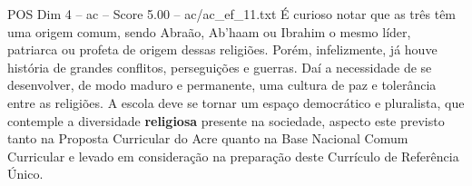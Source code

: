 \begin{textsample}{POS Dim 4 – ac – Score 5.00 – ac/ac\_ef\_11.txt}
É curioso notar que as três têm uma origem comum, sendo Abraão, Ab’haam ou Ibrahim o mesmo líder, patriarca ou profeta de origem dessas religiões.
Porém, infelizmente, já houve história de grandes conflitos, perseguições e guerras.
Daí a necessidade de se desenvolver, de modo maduro e permanente, uma cultura de paz e tolerância entre as religiões.
A escola deve se tornar um espaço democrático e pluralista, que contemple a diversidade \textbf{religiosa} presente na sociedade, aspecto este previsto tanto na Proposta Curricular do Acre quanto na Base Nacional Comum Curricular e levado em consideração na preparação deste Currículo de Referência Único.

\end{textsample}
